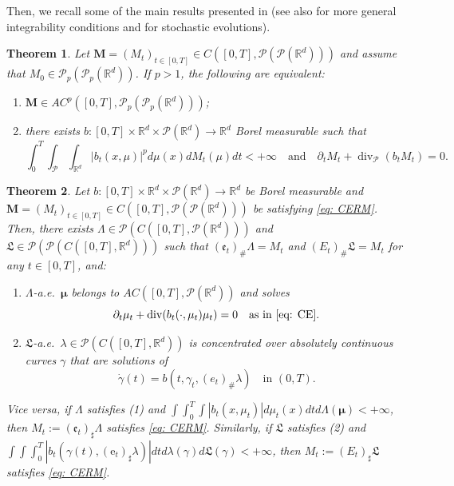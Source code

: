 \documentclass[10pt,leqno]{amsart}
\numberwithin{equation}{section}
\newtheorem{teorema}{Theorem}[section]
\newcommand{\R}{\mathbb{R}}
\newcommand{\PP}{\mathcal{P}}
\newcommand{\e}{\mathrm{e}}
\begin{document}
Then, we recall some of the main results presented in \cite{pinzisavare2025} (see also \cite{pinzifirst2025} for more general integrability conditions and for stochastic evolutions).

\begin{teorema}
    Let $\boldsymbol{M} = (M_t)_{t\in[0,T]}\in C([0,T],\PP(\PP(\R^d))) $ and assume that $M_0 \in \PP_p(\PP_p(\R^d))$. If $p>1$, the following are equivalent:
    \begin{enumerate}
        \item $\boldsymbol{M}\in AC^p([0,T],\PP_p(\PP_p(\R^d)))$;
        \item there exists $b:[0,T]\times \R^d \times \PP(\R^d) \to \R^d$ Borel measurable such that 
        \begin{equation}
            \int_0^T \int_\PP \int_{\R^d}|b_t(x,\mu)|^pd\mu(x) dM_t(\mu) dt <+\infty \quad \text{and} \quad \partial_tM_t + \operatorname{div}_\PP(b_tM_t) = 0.
        \end{equation}
    \end{enumerate}
\end{teorema}

\begin{teorema}\label{thm: nested superposition}
    Let $b:[0,T]\times \R^d \times \PP(\R^d)\to \R^d$ be Borel measurable and $\boldsymbol{M} = (M_t)_{t\in[0,T]} \in C([0,T],\PP(\PP(\R^d)))$ be satisfying \eqref{eq: CERM}. Then, there exists $\Lambda\in \PP(C([0,T],\PP(\R^d)))$ and $\mathfrak{L}\in \PP(\PP(C([0,T],\R^d)))$ such that $(\mathfrak{e}_t)_{\#}\Lambda = M_t$ and $(E_t)_\#\mathfrak{L}=M_t$ for any $t\in[0,T]$, and:
    \begin{enumerate}
        \item\label{prop of Lambda R^d}  $\Lambda$-a.e.~$\boldsymbol{\mu}$ belongs to $
        AC([0,T],\PP(\R^d))$ 
        and solves 
        $$\partial_t\mu_t + \operatorname{div}(b_t(\cdot,\mu_t)\mu_t)=0
        \quad\text{as in \eqref{eq: CE}}.$$
        \item\label{properties of L R^d} $\mathfrak{L}$-a.e.~$\lambda\in \PP(C([0,T],\R^d))$
        is concentrated over 
        absolutely continuous curves 
        $\gamma$ that are solutions of
        $$\dot{\gamma}(t) = b(t,\gamma_t,(e_t)_\#\lambda)\quad\text{in }(0,T).$$
    \end{enumerate}
    Vice versa, if $\Lambda$ satisfies (1) and $\int \int_0^T \int|b_t(x,\mu_t)|d\mu_t(x) dt d\Lambda(\boldsymbol{\mu}) <+\infty$, then $M_t := (\mathfrak{e}_t)_\sharp \Lambda$ satisfies \eqref{eq: CERM}. Similarly, if $\mathfrak{L}$ satisfies (2) and $\int\int \int_0^T |b_t(\gamma(t),(\e_t)_\sharp\lambda)|dt d\lambda(\gamma) d\mathfrak{L}(\gamma) <+\infty$, then $M_t := (E_t)_\sharp\mathfrak{L}$ satisfies \eqref{eq: CERM}.
\end{teorema}
\end{document}
